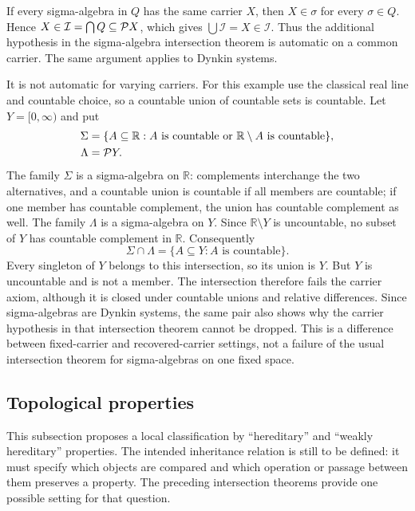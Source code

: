 \begin{example}
If every sigma-algebra in $Q$ has the same carrier $X$, then
$X\in\sigma$ for every $\sigma\in Q$. Hence
$X\in\mathcal I=\bigcap Q\subseteq\mathcal{P} X$, which gives
$\bigcup\mathcal I=X\in\mathcal I$. Thus the additional hypothesis
in the sigma-algebra intersection theorem is automatic on a common
carrier. The same argument applies to Dynkin systems.

It is not automatic for varying carriers. For this example use the
classical real line and countable choice, so a countable union of
countable sets is countable. Let $Y=[0,\infty)$ and put
\[
\begin{split}
\Sigma&=\{A\subseteq\mathbb R:
      A\text{ is countable or }\mathbb R\setminus A
                         \text{ is countable}\},\\
\Lambda&=\mathcal{P} Y.
\end{split}
\]
The family $\Sigma$ is a sigma-algebra on $\mathbb R$:
complements interchange the two alternatives, and a countable union
is countable if all members are countable; if one member has countable
complement, the union has countable complement as well. The family
$\Lambda$ is a sigma-algebra on $Y$.
Since $\mathbb R\setminus Y$ is uncountable, no subset of $Y$ has
countable complement in $\mathbb R$. Consequently
\[
\Sigma\cap\Lambda=\{A\subseteq Y:A\text{ is countable}\}.
\]
Every singleton of $Y$ belongs to this intersection, so its union is
$Y$. But $Y$ is uncountable and is not a member. The intersection
therefore fails the carrier axiom, although it is closed under
countable unions and relative differences. Since sigma-algebras are
Dynkin systems, the same pair also shows why the carrier hypothesis
in that intersection theorem cannot be dropped. This is a difference
between fixed-carrier and recovered-carrier settings, not a failure of
the usual intersection theorem for sigma-algebras on one fixed space.
\end{example}

\subsection{Topological properties}
This subsection proposes a local classification by ``hereditary'' and
``weakly hereditary'' properties. The intended inheritance relation is
still to be defined: it must specify which objects are compared and which
operation or passage between them preserves a property. The preceding
intersection theorems provide one possible setting for that question.

